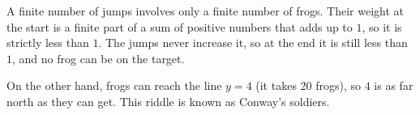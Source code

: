 A finite number of jumps involves only a finite number of frogs. Their weight at the start is a finite part of a sum of
positive numbers that adds up to $1$, so it is strictly less than $1$. The jumps never increase it, so at the end it is still less
than $1$, and no frog can be on the target.

On the other hand, frogs can reach the line $y=4$ (it takes 20 frogs), so $4$ is as far north as they can get.
This riddle is known as Conway's soldiers.
